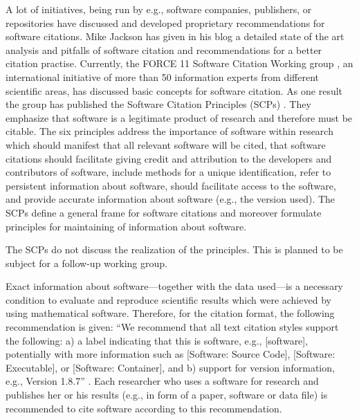\documentclass[12pt]{article}
\begin{document}
A lot of initiatives, being run by e.g., software companies, publishers, or repositories have discussed and developed proprietary recommendations for software citations. Mike Jackson  has given in his blog \cite{Jackson} a detailed state of the art analysis and pitfalls of software citation and recommendations for a better citation practise. Currently, the FORCE 11 Software Citation Working group \cite{SoftwareCitationWG}, an international initiative of more than 50 information experts from different scientific areas, has discussed basic concepts for software citation. As one result the group has published the Software Citation Principles (SCPs) \cite{SoftwareCitationPrinciples}. They emphasize that software is a legitimate product of research and therefore must be citable.  The six principles address the importance of software within research which should manifest that all relevant software will be cited, that software citations should facilitate giving credit and attribution to the developers and contributors of software, include methods for a  unique identification, refer to persistent information about software, should facilitate access to the software, and provide accurate information about software (e.g., the version used). The SCPs define a general frame for software citations and moreover formulate principles for  maintaining of information about software.

The SCPs do not discuss the realization of the principles.  This is planned to be subject for a follow-up working group.\par

Exact information about software---together with the data used---is a necessary condition to evaluate and reproduce scientific results which were achieved by using mathematical software. Therefore, for the citation format, the following recommendation is given: ``We recommend that all text citation styles support the following: a) a label indicating that this is software, e.g., [software], potentially with more information such as [Software: Source Code], [Software: Executable], or [Software: Container], and b) support for version information, e.g., Version 1.8.7'' \cite{SoftwareCitationPrinciples}.  Each researcher who uses a software for research and publishes her or his results (e.g., in form of a paper, software or data file) is recommended to cite software according to this recommendation.
\end{document}
